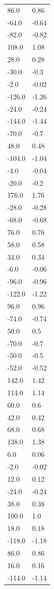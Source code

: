 \begin{longtable}{ll}
86.0 & 0.86 \\
-64.0 & -0.64 \\
-82.0 & -0.82 \\
108.0 & 1.08 \\
28.0 & 0.28 \\
-30.0 & -0.3 \\
-2.0 & -0.02 \\
-126.0 & -1.26 \\
-24.0 & -0.24 \\
-144.0 & -1.44 \\
-70.0 & -0.7 \\
48.0 & 0.48 \\
-104.0 & -1.04 \\
-4.0 & -0.04 \\
-20.0 & -0.2 \\
176.0 & 1.76 \\
-28.0 & -0.28 \\
-68.0 & -0.68 \\
76.0 & 0.76 \\
58.0 & 0.58 \\
34.0 & 0.34 \\
-6.0 & -0.06 \\
-96.0 & -0.96 \\
-122.0 & -1.22 \\
96.0 & 0.96 \\
-74.0 & -0.74 \\
50.0 & 0.5 \\
-70.0 & -0.7 \\
-50.0 & -0.5 \\
-52.0 & -0.52 \\
142.0 & 1.42 \\
114.0 & 1.14 \\
60.0 & 0.6 \\
42.0 & 0.42 \\
68.0 & 0.68 \\
138.0 & 1.38 \\
6.0 & 0.06 \\
-2.0 & -0.02 \\
12.0 & 0.12 \\
-24.0 & -0.24 \\
38.0 & 0.38 \\
100.0 & 1.0 \\
18.0 & 0.18 \\
-118.0 & -1.18 \\
86.0 & 0.86 \\
16.0 & 0.16 \\
-114.0 & -1.14 \\

\end{longtable}
